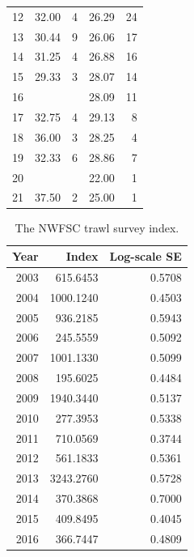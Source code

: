 \documentclass[12pt,]{article}
\begin{document}
\begin{table}[ht]
\begin{tabular}{rrrrr}
   12 & 32.00 &   4 & 26.29 &  24 \\ 
   13 & 30.44 &   9 & 26.06 &  17 \\ 
   14 & 31.25 &   4 & 26.88 &  16 \\ 
   15 & 29.33 &   3 & 28.07 &  14 \\ 
   16 &  &  & 28.09 &  11 \\ 
   17 & 32.75 &   4 & 29.13 &   8 \\ 
   18 & 36.00 &   3 & 28.25 &   4 \\ 
   19 & 32.33 &   6 & 28.86 &   7 \\ 
   20 &  &  & 22.00 &   1 \\ 
   21 & 37.50 &   2 & 25.00 &   1 \\ 
   \hline
\end{tabular}
\end{table}\begin{table}[ht]
\centering
\caption{The NWFSC trawl survey
                                            index.} 
\label{tab:Fleet8_NWFSCTrawl_index}
\begin{tabular}{rrr}
  \hline
Year & Index & Log-scale SE \\ 
  \hline
 2003 & 615.6453 & 0.5708 \\ 
   2004 & 1000.1240 & 0.4503 \\ 
   2005 & 936.2185 & 0.5943 \\ 
   2006 & 245.5559 & 0.5092 \\ 
   2007 & 1001.1330 & 0.5099 \\ 
   2008 & 195.6025 & 0.4484 \\ 
   2009 & 1940.3440 & 0.5137 \\ 
   2010 & 277.3953 & 0.5338 \\ 
   2011 & 710.0569 & 0.3744 \\ 
   2012 & 561.1833 & 0.5361 \\ 
   2013 & 3243.2760 & 0.5728 \\ 
   2014 & 370.3868 & 0.7000 \\ 
   2015 & 409.8495 & 0.4045 \\ 
   2016 & 366.7447 & 0.4809 \\ 
   \hline
\end{tabular}
\end{table}

\FloatBarrier
\end{document}
